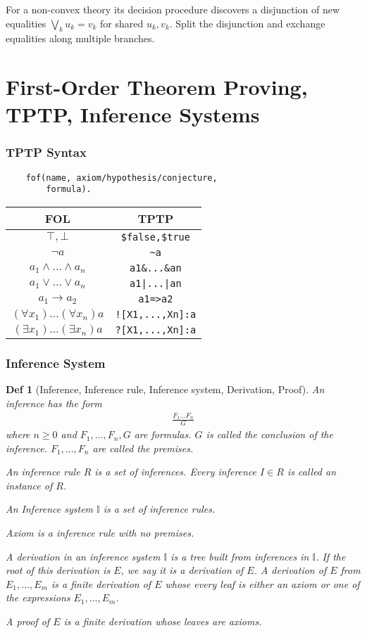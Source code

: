 \documentclass[]{article}
\newtheorem*{definition*}{Def}
\begin{document}
For a non-convex theory its decision procedure discovers a disjunction of new equalities $\bigvee_k u_k = v_k$ for shared $u_k, v_k$. Split the disjunction and exchange equalities along multiple branches.

\section{First-Order Theorem Proving, TPTP, Inference Systems}

\subsubsection{TPTP Syntax}
\begin{verbatim}
	fof(name, axiom/hypothesis/conjecture,
	    formula).
\end{verbatim}

\begin{tabular}{c|c}
	FOL & TPTP \\
	\hline
	$\top, \bot$                        & \verb*|$false,$true| \\
	$\lnot a$                           & \verb*|~a| \\
	$a_1 \land ... \land a_n$           & \verb*|a1&...&an| \\
	$a_1 \lor ... \lor a_n$             & \verb*@a1|...|an@ \\
	$a_1 \rightarrow a_2$               & \verb*|a1=>a2| \\
	$(\forall x_1) ... (\forall x_n) a$ & \verb*|![X1,...,Xn]:a| \\
	$(\exists x_1) ... (\exists x_n) a$ & \verb*|?[X1,...,Xn]:a| \\
\end{tabular}

\subsubsection{Inference System}

\begin{definition*}[Inference, Inference rule, Inference system, Derivation, Proof]
	An inference has the form
	\begin{align*}
		\frac{F_1 ... F_n}{G}
	\end{align*}
	where $n \geq 0$ and $F_1,...,F_n,G$ are formulas. $G$ is called the conclusion of the inference. $F_1,...,F_n$ are called the premises.
	
	An inference rule $R$ is a set of inferences. Every inference $I\in R$ is called an instance of $R$.
	
	An Inference system $\mathbb{I}$ is a set of inference rules.
	
	Axiom is a inference rule with no premises.
	
	A derivation in an inference system $\mathbb{I}$ is a tree built from inferences in $\mathbb{I}$. If the root of this derivation is $E$, we say it is a derivation of $E$. A derivation of $E$ from $E_1,...,E_m$ is a finite derivation of $E$ whose every leaf is either an axiom or one of the expressions $E_1,...,E_m$.
	
	A proof of $E$ is a finite derivation whose leaves are axioms.
\end{definition*}
\end{document}
